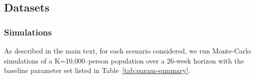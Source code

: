 \documentclass[sigconf,review]{acmart}
\begin{document}
\subsection{Datasets}
\label{data}
\subsubsection{Simulations}
As described in the main text, for each scenario considered, we run Monte-Carlo simulations of a K=10{,}000--person population over a 26-week horizon with the baseline parameter set listed in Table~\ref{tab:param-summary}.


\end{document}
